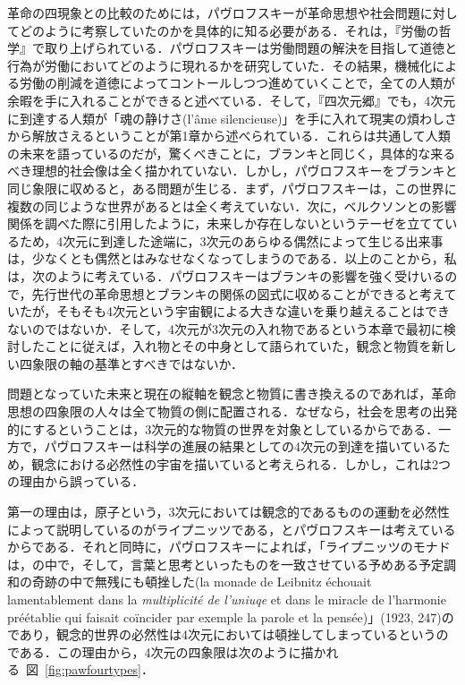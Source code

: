 革命の四現象との比較のためには，パヴロフスキーが革命思想や社会問題に対してどのように考察していたのかを具体的に知る必要がある．それは，『労働の哲学』で取り上げられている．パヴロフスキーは労働問題の解決を目指して道徳と行為が労働においてどのように現れるかを研究していた．その結果，機械化による労働の削減を道徳によってコントールしつつ進めていくことで，全ての人類が余暇を手に入れることができると述べている．そして，『四次元郷』でも，4次元に到達する人類が「魂の静けさ(l'âme silencieuse)」を手に入れて現実の煩わしさから解放さえるということが第1章から述べられている．これらは共通して人類の未来を語っているのだが，驚くべきことに，ブランキと同じく，具体的な来るべき理想的社会像は全く描かれていない．しかし，パヴロフスキーをブランキと同じ象限に収めると，ある問題が生じる．まず，パヴロフスキーは，この世界に複数の同じような世界があるとは全く考えていない．次に，ベルクソンとの影響関係を調べた際に引用したように，未来しか存在しないというテーゼを立てているため，4次元に到達した途端に，3次元のあらゆる偶然によって生じる出来事は，少なくとも偶然とはみなせなくなってしまうのである．以上のことから，私は，次のように考えている．パヴロフスキーはブランキの影響を強く受けいるので，先行世代の革命思想とブランキの関係の図式に収めることができると考えていたが，そもそも4次元という宇宙観による大きな違いを乗り越えることはできないのではないか．そして，4次元が3次元の入れ物であるという本章で最初に検討したことに従えば，入れ物とその中身として語られていた，観念と物質を新しい四象限の軸の基準とすべきではないか．

問題となっていた未来と現在の縦軸を観念と物質に書き換えるのであれば，革命思想の四象限の人々は全て物質の側に配置される．なぜなら，社会を思考の出発的にするということは，3次元的な物質の世界を対象としているからである．一方で，パヴロフスキーは科学の進展の結果としての4次元の到達を描いているため，観念における必然性の宇宙を描いていると考えられる．しかし，これは2つの理由から誤っている．

第一の理由は，原子という，3次元においては観念的であるものの運動を必然性によって説明しているのがライプニッツである，とパヴロフスキーは考えているからである．それと同時に，パヴロフスキーによれば，「ライプニッツのモナドは，の中で，そして，言葉と思考といったものを一致させている予めある予定調和の奇跡の中で無残にも頓挫した(la monade de Leibnitz échouait lamentablement dans la \emph{multiplicité de l'uniuqe} et dans le miracle de l'harmonie préétablie qui faisait coïncider par exemple la parole et la pensée)」(1923, 247)のであり，観念的世界の必然性は4次元においては頓挫してしまっているというのである．この理由から，4次元の四象限は次のように描かれる~図~\ref{fig:pawfourtypes}．

